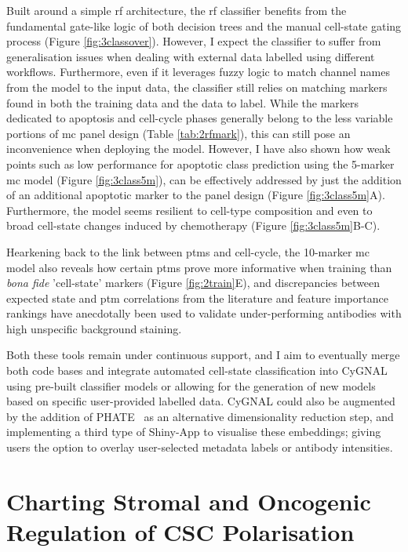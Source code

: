 Built around a simple \acrfull{rf} architecture, the \acrshort{rf} classifier benefits from the fundamental gate-like logic of both decision trees and the manual cell-state gating process (Figure \ref{fig:3classover}). However, I expect the classifier to suffer from generalisation issues when dealing with external data labelled using different workflows. Furthermore, even if it leverages fuzzy logic to match channel names from the model to the input data, the classifier still relies on matching markers found in both the training data and the data to label. While the markers dedicated to apoptosis and cell-cycle phases generally belong to the less variable portions of \acrshort{mc} panel design (Table \ref{tab:2rfmark}), this can still pose an inconvenience when deploying the model. However, I have also shown how weak points such as low performance for apoptotic class prediction using the 5-marker \acrshort{mc} model (Figure \ref{fig:3class5m}), can be effectively addressed by just the addition of an additional apoptotic marker to the panel design (Figure \ref{fig:3class5m}A). Furthermore, the model seems resilient to cell-type composition and even to broad cell-state changes induced by chemotherapy (Figure \ref{fig:3class5m}B-C).

Hearkening back to the link between \acrshort{ptm}s and cell-cycle, the 10-marker \acrshort{mc} model also reveals how certain \acrshort{ptm}s prove more informative when training than \emph{bona fide} 'cell-state' markers (Figure \ref{fig:2train}E), and discrepancies between expected state and \acrshort{ptm} correlations from the literature and feature importance rankings have anecdotally been used to validate under-performing antibodies with high unspecific background staining.

Both these tools remain under continuous support, and I aim to eventually merge both code bases and integrate automated cell-state classification into CyGNAL using pre-built classifier models or allowing for the generation of new models based on specific user-provided labelled data.
CyGNAL could also be augmented by the addition of PHATE~\cite{moon_visualizing_2019} as an alternative dimensionality reduction step, and implementing a third type of Shiny-App to visualise these embeddings; giving users the option to overlay user-selected metadata labels or antibody intensities.

\newpage
\section{Charting Stromal and Oncogenic Regulation of CSC Polarisation}

